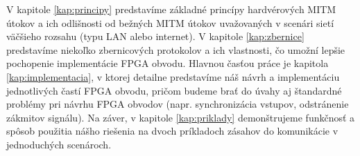 V kapitole \ref{kap:principy} predstavíme základné princípy hardvérových MITM útokov a ich odlišnosti od bežných MITM útokov uvažovaných v scenári sietí väčšieho rozsahu (typu LAN alebo internet). V kapitole \ref{kap:zbernice} predstavíme niekoľko zbernicových protokolov a ich vlastnosti, čo umožní lepšie pochopenie implementácie FPGA obvodu. Hlavnou časťou práce je kapitola \ref{kap:implementacia}, v ktorej detailne predstavíme náš návrh a implementáciu jednotlivých častí FPGA obvodu, pričom budeme brať do úvahy aj štandardné problémy pri návrhu FPGA obvodov (napr. synchronizácia vstupov, odstránenie zákmitov signálu). Na záver, v kapitole \ref{kap:priklady} demonštrujeme funkčnosť a spôsob použitia nášho riešenia na dvoch príkladoch zásahov do komunikácie v jednoduchých scenároch.